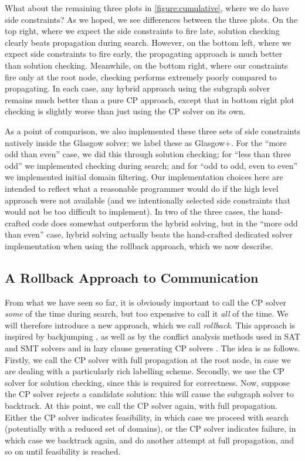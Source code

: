\documentclass[runningheads]{llncs}
\begin{document}
What about the remaining three plots in \cref{figure:cumulative}, where we do have side constraints?
As we hoped, we see differences between the three plots. On the top right, where we expect the side
constraints to fire late, solution checking clearly beats propagation during search. However, on the
bottom left, where we expect side constraints to fire early, the propagating approach is much better
than solution checking. Meanwhile, on the bottom right, where our constraints fire only at the root
node, checking performs extremely poorly compared to propagating. In each case, any hybrid approach using
the subgraph solver remains much better than a pure CP approach, except that in bottom right plot
checking is slightly worse than just using the CP solver on its own.

As a point of comparison, we also implemented these three sets of side constraints natively inside
the Glasgow solver: we label these as Glasgow+. For the ``more odd than even'' case, we did this
through solution checking; for ``less than three odd'' we implemented checking during search; and
for ``odd to odd, even to even'' we implemented initial domain filtering. Our implementation choices
here are intended to reflect what a reasonable programmer would do if the high level approach were
not available (and we intentionally selected side constraints that would not be too difficult to
implement). In two of the three cases, the hand-crafted code does somewhat outperform the hybrid
solving, but in the ``more odd than even'' case, hybrid solving actually beats the hand-crafted
dedicated solver implementation when using the rollback approach, which we now describe.

\subsection{A Rollback Approach to Communication}

From what we have seen so far, it is obviously important to call the CP solver \emph{some} of the
time during search, but too expensive to call it \emph{all} of the time. We will therefore introduce
a new approach, which we call \emph{rollback}. This approach is inspired by backjumping
\cite{DBLP:journals/ci/Prosser93}, as well as by the conflict analysis methods used in SAT and SMT
solvers \cite{DBLP:conf/iccad/SilvaS96} and in lazy clause generating CP solvers
\cite{DBLP:conf/cp/OhrimenkoSC07,DBLP:conf/cpaior/Stuckey10}. The idea is as follows.  Firstly, we
call the CP solver with full propagation at the root node, in case we are dealing with a
particularly rich labelling scheme.  Secondly, we use the CP solver for solution checking, since
this is required for correctness. Now, suppose the CP solver rejects a candidate solution: this will
cause the subgraph solver to backtrack. At this point, we call the CP solver again, with full
propagation. Either the CP solver indicates feasibility, in which case we proceed with search
(potentially with a reduced set of domains), or the CP solver indicates failure, in which case we
backtrack again, and do another attempt at full propagation, and so on until feasibility is reached.
\end{document}
